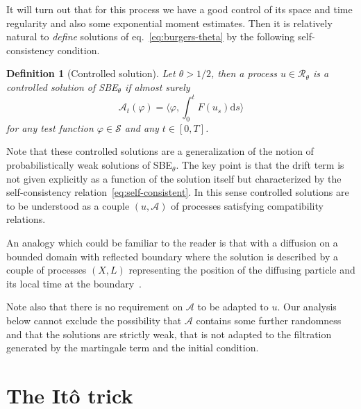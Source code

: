 \documentclass[11pt,a4paper,reqno]{amsart}
\newtheorem{definition}{Definition}
\newcommand{\dd}{\mathrm{d}}
\newcommand{\cA}{\mathcal{A}}
\begin{document}
 It will turn out that for this process we have a good control of its space and time regularity and also some exponential moment estimates.  Then it is relatively natural to \emph{define} solutions of eq.~\eqref{eq:burgers-theta} by the following self-consistency condition.

\begin{definition}[Controlled solution] Let $\theta>1/2$, then a process $u\in\mathcal{R}_\theta$ is a \emph{controlled solution} of   SBE$_\theta$ if almost surely
\begin{equation}
\label{eq:self-consistent}
 \cA_t(\varphi) = \langle \varphi, \int_0^t  F(u_s)  \dd s \rangle
\end{equation}
for any test function $\varphi \in \mathcal S$ and any $t\in[0,T]$.
\end{definition}


Note that these controlled solutions are a generalization of the notion of probabilistically weak solutions of  SBE$_\theta$. The key point is that the drift term is not given explicitly as a function of the solution itself but characterized by the 
self-consistency relation~\eqref{eq:self-consistent}. In this sense controlled solutions are to be understood as a couple $(u,\mathcal{A})$ of processes satisfying compatibility relations.

An analogy which could be familiar to the reader is that with a diffusion on a bounded domain with reflected boundary where the solution is described by a couple of processes $(X,L)$ representing the position of the diffusing particle and its local time at the boundary~\cite{RY}. 

Note also that there is no requirement on $\mathcal{A}$ to be adapted to $u$. Our analysis below cannot exclude the possibility that $\mathcal{A}$ contains some further randomness and that the solutions are strictly weak, that is not adapted to the filtration generated by the martingale term and the initial condition.

\section{The It\^o trick}
\label{sec:ito-trick}
\end{document}
